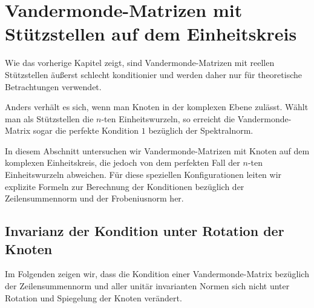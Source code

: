 \chapter{Vandermonde-Matrizen mit Stützstellen auf dem Einheitskreis}

Wie das vorherige Kapitel zeigt, sind Vandermonde-Matrizen mit reellen
Stützstellen äußerst schlecht konditionier und werden daher nur für
theoretische Betrachtungen verwendet.

Anders verhält es sich, wenn man Knoten in der komplexen Ebene zulässt.
Wählt man als Stützstellen die $n$-ten Einheitswurzeln, so erreicht die
Vandermonde-Matrix sogar die perfekte Kondition $1$ bezüglich der Spektralnorm.

In diesem Abschnitt untersuchen wir Vandermonde-Matrizen mit Knoten auf dem
komplexen Einheitskreis, die jedoch von dem perfekten Fall der $n$-ten
Einheitswurzeln abweichen.
Für diese speziellen Konfigurationen leiten wir explizite Formeln zur
Berechnung der Konditionen bezüglich der Zeilensummennorm und der Frobeniusnorm
her.

\section{Invarianz der Kondition unter Rotation der Knoten}

Im Folgenden zeigen wir, dass die Kondition einer Vandermonde-Matrix bezüglich
der Zeilensummennorm und aller unitär invarianten Normen sich nicht unter
Rotation und Spiegelung der Knoten verändert.


